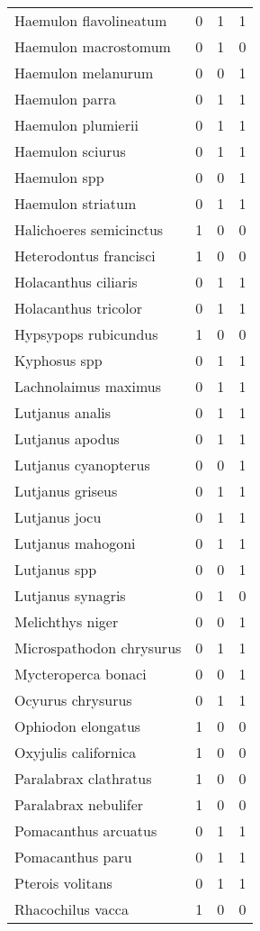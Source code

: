 \begin{longtable}{lrrr}
Haemulon flavolineatum & 0 & 1 & 1\\
Haemulon macrostomum & 0 & 1 & 0\\
\addlinespace
Haemulon melanurum & 0 & 0 & 1\\
Haemulon parra & 0 & 1 & 1\\
Haemulon plumierii & 0 & 1 & 1\\
Haemulon sciurus & 0 & 1 & 1\\
Haemulon spp & 0 & 0 & 1\\
\addlinespace
Haemulon striatum & 0 & 1 & 1\\
Halichoeres semicinctus & 1 & 0 & 0\\
Heterodontus francisci & 1 & 0 & 0\\
Holacanthus ciliaris & 0 & 1 & 1\\
Holacanthus tricolor & 0 & 1 & 1\\
\addlinespace
Hypsypops rubicundus & 1 & 0 & 0\\
Kyphosus spp & 0 & 1 & 1\\
Lachnolaimus maximus & 0 & 1 & 1\\
Lutjanus analis & 0 & 1 & 1\\
Lutjanus apodus & 0 & 1 & 1\\
\addlinespace
Lutjanus cyanopterus & 0 & 0 & 1\\
Lutjanus griseus & 0 & 1 & 1\\
Lutjanus jocu & 0 & 1 & 1\\
Lutjanus mahogoni & 0 & 1 & 1\\
Lutjanus spp & 0 & 0 & 1\\
\addlinespace
Lutjanus synagris & 0 & 1 & 0\\
Melichthys niger & 0 & 0 & 1\\
Microspathodon chrysurus & 0 & 1 & 1\\
Mycteroperca bonaci & 0 & 0 & 1\\
Ocyurus chrysurus & 0 & 1 & 1\\
\addlinespace
Ophiodon elongatus & 1 & 0 & 0\\
Oxyjulis californica & 1 & 0 & 0\\
Paralabrax clathratus & 1 & 0 & 0\\
Paralabrax nebulifer & 1 & 0 & 0\\
Pomacanthus arcuatus & 0 & 1 & 1\\
\addlinespace
Pomacanthus paru & 0 & 1 & 1\\
Pterois volitans & 0 & 1 & 1\\
Rhacochilus vacca & 1 & 0 & 0\\

\end{longtable}
